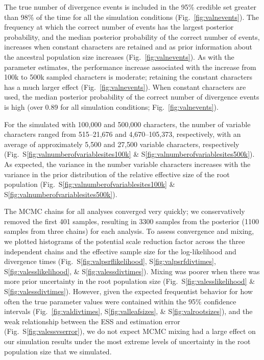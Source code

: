 The true number of divergence events is included in the 95\% credible set
greater than 98\% of the time for all the simulation conditions
(Fig.~\ref{fig:valnevents}).
The frequency at which the correct number of events has the largest posterior
probability, and the median posterior probability of the correct number of
events,
increases when constant characters are retained and as prior information about
the ancestral population size increases 
(Fig.~\ref{fig:valnevents}).
As with the parameter estimates, the performance increase associated with the
increase from 100k to 500k sampled characters is moderate; retaining the
constant characters has a much larger effect (Fig.~\ref{fig:valnevents}).
When constant characters are used, the median posterior
probability of the correct number of divergence events is high (over 0.89
for all simulation conditions; 
Fig.~\ref{fig:valnevents}).

\ifembed{

}{}

For the \datasets simulated with 100,000 and 500,000 characters, the number of
variable characters ranged from
515--21,676 
and
4,670--105,373,
respectively, with an average of approximately
5,500
and 
27,500 variable characters, respectively
(Fig.\ S\ref{fig:valnumberofvariablesites100k} \&
S\ref{fig:valnumberofvariablesites500k}).
As expected, the variance in the number variable characters increases with the
variance in the prior distribution of the relative effective size of the root
population
(Fig.\ S\ref{fig:valnumberofvariablesites100k} \&
S\ref{fig:valnumberofvariablesites500k}).

The MCMC chains for all analyses converged very quickly;
we conservatively removed the first 401 samples, resulting in 3300 samples from
the posterior (1100 samples from three chains) for each analysis.
To assess convergence and mixing, we plotted histograms of the potential scale
reduction factor across the three independent chains and the effective sample
size for the log-likelihood and divergence times
(Fig.\ S\ref{fig:valpsrflikelihood}, S\ref{fig:valpsrfdivtimes},
S\ref{fig:valesslikelihood}, \& S\ref{fig:valessdivtimes}).
Mixing was poorer when there was more prior uncertainty in the root population
size
(Fig.\ S\ref{fig:valesslikelihood} \& S\ref{fig:valessdivtimes}).
However, given the expected frequentist behavior for how often the true
parameter values were contained within the 95\% confidence intervals (Fig.\ 
\ref{fig:valdivtimes}, S\ref{fig:valleafsizes}, \& S\ref{fig:valrootsizes}),
and the weak relationship between the ESS and estimation error
(Fig.~S\ref{fig:valessvserror}),
we do not expect MCMC mixing had a large effect on our simulation results under
the most extreme levels of uncertainty in the root population size that we
simulated.



